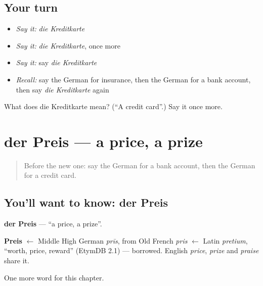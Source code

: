 \subsection*{Your turn}
\begin{itemize}
\raggedright
  \item \emph{Say it:} \emph{die Kreditkarte}
  \item \emph{Say it:} \emph{die Kreditkarte}, once more
  \item \emph{Say it:} say \emph{die Kreditkarte}
  \item \emph{Recall:} say the German for insurance, then the German for a bank account, then say \emph{die Kreditkarte} again
\end{itemize}

\begin{tcolorbox}[breakable,colback=teal!4,colframe=teal!35!black,title={Before you move on}]
What does die Kreditkarte mean? (\textquotedblleft{}A credit card\textquotedblright{}.) Say it once more.
\end{tcolorbox}
\section[der Preis]{der Preis — a price, a prize}

\label{lesson:GE-C157-preis}



\begin{quote}
Before the new one: say the German for a bank account, then the German for a credit card.
\end{quote}

\subsection*{You'll want to know: der Preis}
\textbf{der Preis} — \textquotedblleft{}a price, a prize\textquotedblright{}.

\begin{cousinweb}
\textbf{Preis} $\leftarrow$ Middle High German \emph{prīs}, from Old French \emph{pris} $\leftarrow$ Latin \emph{pretium}, \textquotedblleft{}worth, price, reward\textquotedblright{} (EtymDB 2.1) — borrowed. English \emph{price}, \emph{prize} and \emph{praise} share it.
\end{cousinweb}

\begin{grammarlens}[title={What you've built}]
One more word for this chapter.
\end{grammarlens}

